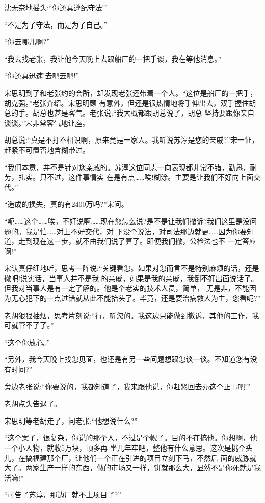 \documentclass[11pt,a4paper,onecolumn]{article}
\begin{document}
沈无奈地摇头:``你还真遵纪守法!''

``不是为了守法，而是为了自己。''

``你去哪儿啊?''

``我去找老张，我让他今天晚上去跟船厂的一把手谈，我在等他消息。''

``你还真迅速!去吧去吧!''

宋思明到了和老张约的会所，却发现老张还带着一个人。``这位是船厂的一把手，胡克强。''老张介绍。宋思明颇
有意外，但还是很热情地将手伸出去，双手握住胡总的手。胡总也甚是客气。老张说:``我大概都跟胡总说了，胡总
坚持要跟你亲自谈谈。''宋非常客气地让座。

胡总说:``真是不打不相识啊，原来竟是一家人。我听说苏淳是您的亲戚?''宋一怔，赶紧不可置否地含糊带过。

``我们本意，并不是针对您亲戚的。苏淳这位同志一向表现都非常不错，勤恳，耐劳，扎实。只不过，这件事情实
在是有点……唉!糊涂。主要是让我们不好向上面交代。''

``造成的损失，真的有2400万吗?''宋问。

``呃……这个……唉，不好说啊……现在您怎么说?是不是让我们撤诉?我们这里是没问题的。我是怕……对上不好交代，对
下没个说法，对司法那边就更……因为你要知道，走到现在这一步，就不由我们说了算了。即便我们撤，公检法也不
一定答应啊!''

宋认真仔细地听，思考一阵说:``关键看您。如果对您而言不是特别麻烦的话，还是撤吧!说实话，当事人并不是我
的亲戚，如果是我的亲戚，我倒不好出面说话了。但我对当事人是有一定了解的。他是个老实的技术人员，简单，
无是非，不能因为无心犯下的一点过错就从此不能抬头了。毕竟，还是要治病救人为主，您看呢?''

老胡狠狠抽烟，思考片刻说:``行，听您的。我这边只能做到撤诉，其他的工作，我可就管不了了。''

``这个你放心。''

``另外，我今天晚上找您见面，也还是有另一些问题想跟您谈一谈。不知道您有没有时间?''

旁边老张说:``你要说的，我都知道了，我来跟他说，你赶紧回去办这个正事吧!''

老胡点头告退了。

宋思明等老胡走了，问老张:``他想说什么?''

``这个案子，很复杂，你说的那个人，不过是个幌子。目的不在搞他。你想啊，他一个小人物，就收5万块，顶多再
坐几年牢吧，整他有什么意思。这次是挑个头儿，在搞福建那个厂，让他们一个正在引进的项目立刻下马，不然后
面的威胁就大了。两家生产一样的东西，做的市场又一样，饼就那么大，显然不是你死就是我活嘛!''

``可告了苏淳，那边厂就不上项目了?''
\end{document}
